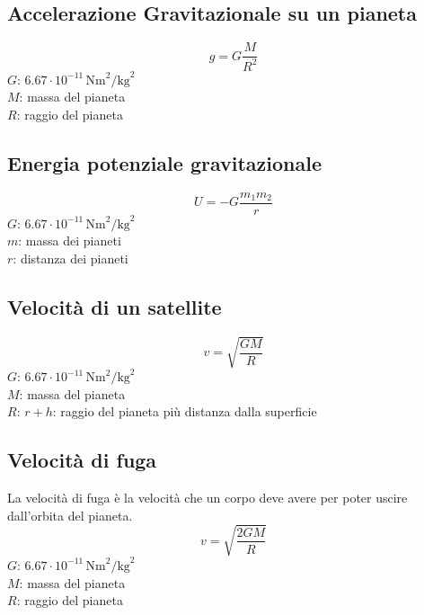 \subsection{Accelerazione Gravitazionale su un pianeta}
\begin{equation*}
g = G\frac{M}{R^2}
\end{equation*}
\hyperref[tab:G]{$G$}: $6.67\cdot10^{-11}\,\text{Nm}^2\text{/kg}^2$\\
$M$: massa del pianeta\\
$R$: raggio del pianeta

\subsection{Energia potenziale gravitazionale}
\begin{equation*}
  U =-G \frac{m_1m_2}{r}
\end{equation*}
\hyperref[tab:G]{$G$}: $6.67\cdot10^{-11}\,\text{Nm}^2\text{/kg}^2$\\
$m$: massa dei pianeti\\
$r$: distanza dei pianeti

\subsection{Velocità di un satellite}
\begin{equation*}
v = \sqrt{\frac{GM}{R}}
\end{equation*}
\hyperref[tab:g]{$G$}: $6.67\cdot10^{-11}\,\text{Nm}^2\text{/kg}^2$\\
$M$: massa del pianeta\\
$R$: $r + h$: raggio del pianeta più distanza dalla superficie

\subsection{Velocità di fuga}
La velocità di fuga è la velocità che un corpo deve avere per poter uscire dall'orbita del pianeta.
\begin{equation*}
v = \sqrt{\frac{2GM}{R}}
\end{equation*}
\hyperref[tab:g]{$G$}: $6.67\cdot10^{-11}\,\text{Nm}^2\text{/kg}^2$\\
$M$: massa del pianeta\\
$R$: raggio del pianeta\\
